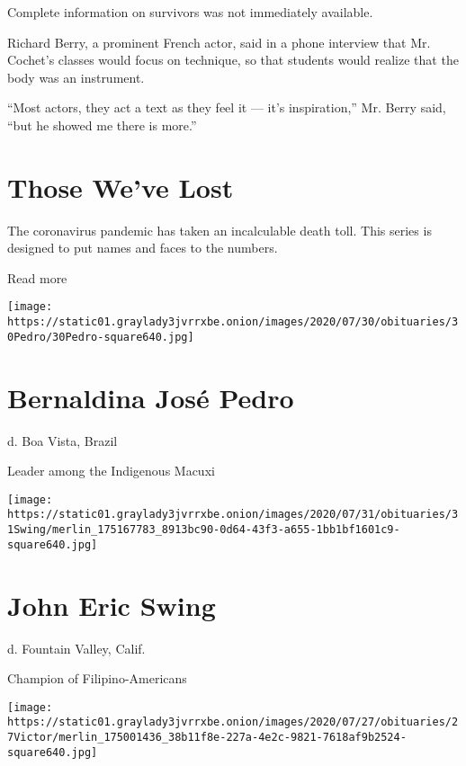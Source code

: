 Complete information on survivors was not immediately available.

Richard Berry, a prominent French actor, said in a phone interview that
Mr. Cochet's classes would focus on technique, so that students would
realize that the body was an instrument.

``Most actors, they act a text as they feel it --- it's inspiration,''
Mr. Berry said, ``but he showed me there is more.''

\href{https://www.nytimes3xbfgragh.onion/interactive/2020/obituaries/people-died-coronavirus-obituaries.html?action=click\&pgtype=Article\&state=default\&region=BELOW_MAIN_CONTENT\&context=covid_obits_promo}{}

\hypertarget{those-weve-lost}{%
\section{Those We've Lost}\label{those-weve-lost}}

The coronavirus pandemic has taken an incalculable death toll. This
series is designed to put names and faces to the numbers.

Read more

\texttt{[image: https://static01.graylady3jvrrxbe.onion/images/2020/07/30/obituaries/30Pedro/30Pedro-square640.jpg]}

\hypertarget{bernaldina-josuxe9-pedro}{%
\section{Bernaldina José Pedro}\label{bernaldina-josuxe9-pedro}}

d. Boa Vista, Brazil

Leader among the Indigenous Macuxi

\texttt{[image: https://static01.graylady3jvrrxbe.onion/images/2020/07/31/obituaries/31Swing/merlin\_175167783\_8913bc90-0d64-43f3-a655-1bb1bf1601c9-square640.jpg]}

\hypertarget{john-eric-swing}{%
\section{John Eric Swing}\label{john-eric-swing}}

d. Fountain Valley, Calif.

Champion of Filipino-Americans

\texttt{[image: https://static01.graylady3jvrrxbe.onion/images/2020/07/27/obituaries/27Victor/merlin\_175001436\_38b11f8e-227a-4e2c-9821-7618af9b2524-square640.jpg]}

